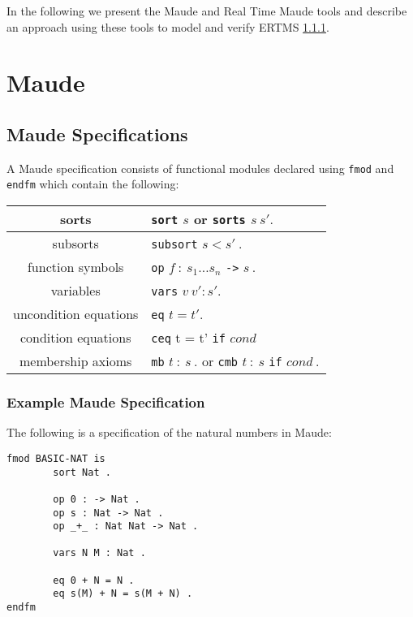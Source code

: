 In the following we present the Maude \cite{Maude} and Real Time Maude \cite{RTMaude} tools and describe an approach using these tools to model and verify ERTMS \ref{}.

\section{Maude}

\subsection{Maude Specifications}

A Maude specification consists of \alert{functional modules} declared using \texttt{fmod} and \texttt{endfm} which contain the following:

\medskip
\begin{center}
\begin{tabular}{| c | l |}
\hline
sorts    & \texttt{sort} $s$ or \texttt{sorts}  $s \ s' .$ \\ \hline
subsorts  & \texttt{subsort} $s < s' \ .$ \\ \hline
function symbols  & \texttt{op} $f \ :  \ s_1 \ldots s_n$ \texttt{->} $s \ .$ \\ \hline
variables  & \texttt{vars} $v \ v' : s' .$\\ \hline
uncondition equations  &\texttt{eq} $t = t' .$\\ \hline
condition equations & \texttt{ceq} t = t' \texttt{if} $cond$ \\ \hline
membership axioms & \texttt{mb} $t \ : \ s \ .$ or \texttt{cmb} $t  \ : \ s$ \texttt{if} $cond \ .$  \\ \hline
\end{tabular}
\end{center}



\subsubsection{Example Maude Specification}
The following is a specification of the natural numbers in Maude:

\begin{verbatim}
fmod BASIC-NAT is
        sort Nat .

        op 0 : -> Nat .
        op s : Nat -> Nat .
        op _+_ : Nat Nat -> Nat .

        vars N M : Nat .

        eq 0 + N = N .
        eq s(M) + N = s(M + N) .
endfm
\end{verbatim}



